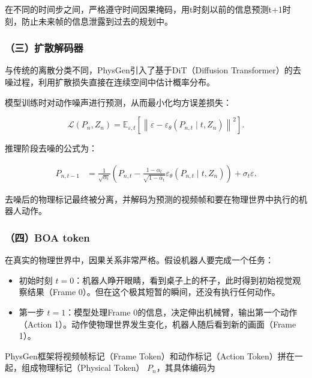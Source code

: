 在不同的时间步之间，严格遵守时间因果掩码，用t时刻以前的信息预测t+1时刻，防止未来帧的信息泄露到过去的规划中。

\hypertarget{ux4e09ux6269ux6563ux89e3ux7801ux5668}{%
\subsubsection{（三）扩散解码器}\label{ux4e09ux6269ux6563ux89e3ux7801ux5668}}

与传统的离散分类不同，PhysGen引入了基于DiT（Diffusion Transformer）的去噪过程，利用扩散损失直接在连续空间中估计概率分布。

模型训练时对动作噪声进行预测，从而最小化均方误差损失：

\[
\mathcal{L}(P_n,Z_n)=\mathbb{E}_{\varepsilon,t}\left[\left\|\varepsilon-\varepsilon_\theta(P_{n,t}\mid t,Z_n)\right\|^2\right].
\]

推理阶段去噪的公式为：

\[
\begin{aligned}
P_{n,t-1}
&=\frac{1}{\sqrt{\alpha_t}}
\left(
P_{n,t}-\frac{1-\alpha_t}{\sqrt{1-\bar{\alpha}_t}}
\varepsilon_\theta(P_{n,t}\mid t,Z_n)
\right)
+\sigma_t\varepsilon.
\end{aligned}
\]

去噪后的物理标记最终被分离，并解码为预测的视频帧和要在物理世界中执行的机器人动作。

\hypertarget{ux56dbboa-token}{%
\subsubsection{（四）BOA token}\label{ux56dbboa-token}}

在真实的物理世界中，因果关系非常严格。假设机器人要完成一个任务：

\begin{itemize}
\tightlist
\item
  初始时刻 \(t=0\)：机器人睁开眼睛，看到桌子上的杯子，此时得到初始视觉观察结果（Frame 0）。但在这个极其短暂的瞬间，还没有执行任何动作。
\item
  第一步 \(t=1\)：模型处理Frame 0的信息，决定伸出机械臂，输出第一个动作（Action 1）。动作使物理世界发生变化，机器人随后看到新的画面（Frame 1）。
\end{itemize}

PhysGen框架将视频帧标记（Frame Token）和动作标记（Action Token）拼在一起，组成物理标记（Physical Token） \(P_n\)，其具体编码为


